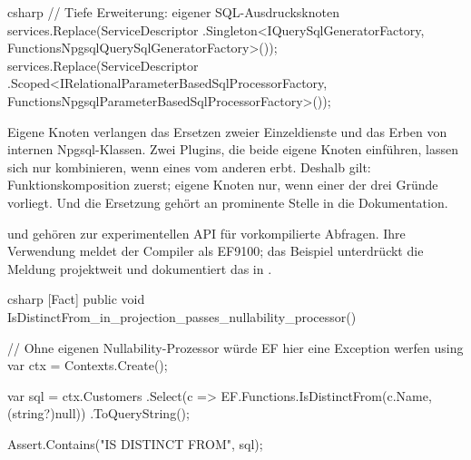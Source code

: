 \begin{sourcecode}{csharp}
// Tiefe Erweiterung: eigener SQL-Ausdrucksknoten
services.Replace(ServiceDescriptor
    .Singleton<IQuerySqlGeneratorFactory, FunctionsNpgsqlQuerySqlGeneratorFactory>());
services.Replace(ServiceDescriptor
    .Scoped<IRelationalParameterBasedSqlProcessorFactory,
        FunctionsNpgsqlParameterBasedSqlProcessorFactory>());
\end{sourcecode}

\begin{important}
  Eigene Knoten verlangen das Ersetzen zweier Einzeldienste und das Erben von internen
  Npgsql-Klassen. Zwei Plugins, die beide eigene Knoten einführen, lassen sich nur
  kombinieren, wenn eines vom anderen erbt. Deshalb gilt: Funktionskomposition zuerst;
  eigene Knoten nur, wenn einer der drei Gründe vorliegt. Und die Ersetzung gehört an
  prominente Stelle in die Dokumentation.
\end{important}

\begin{note}
   und
   gehören
  zur experimentellen API für vorkompilierte Abfragen. Ihre Verwendung meldet der Compiler
  als EF9100; das Beispiel unterdrückt die Meldung projektweit und dokumentiert das in
  .
\end{note}

\begin{sourcecode}{csharp}
[Fact]
public void IsDistinctFrom_in_projection_passes_nullability_processor()
{
    // Ohne eigenen Nullability-Prozessor würde EF hier eine Exception werfen
    using var ctx = Contexts.Create();

    var sql = ctx.Customers
        .Select(c => EF.Functions.IsDistinctFrom(c.Name, (string?)null))
        .ToQueryString();

    Assert.Contains("IS DISTINCT FROM", sql);
}
\end{sourcecode}

